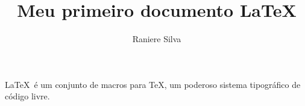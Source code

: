 \documentclass{article}
\title{Meu primeiro documento \LaTeX}
\author{Raniere Silva}
\begin{document}
\maketitle

\LaTeX \ é um conjunto de macros para \TeX, um poderoso sistema tipográfico
de código livre.
\end{document}

